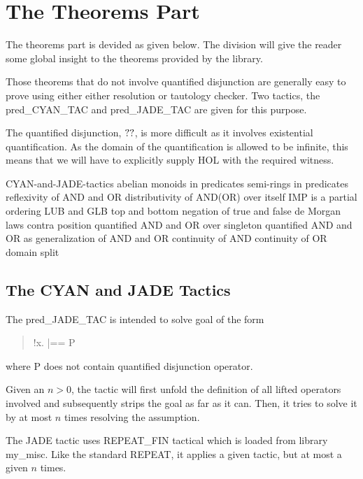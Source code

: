 \chapter{The Theorems Part}
\label{proof}

The theorems part is devided as given below. The division will give
the reader some global insight to the theorems  provided by the
library.

Those theorems that do not involve quantified disjunction are
generally easy to prove using either either resolution or tautology
checker. Two tactics, the \code{}pred_CYAN_TAC\edoc{} and \code{}pred_JADE_TAC\edoc{} are
given for this purpose.

The quantified disjunction, $\mathop{??}$, is more difficult as it involves
existential quantification. As the domain of the quantification is
allowed to be infinite, this means that we will have to explicitly
supply HOL with the required witness.

\enddocs
{}
\endmoddef
\LA{}CYAN-and-JADE-tactics\RA{}
\LA{}abelian monoids in predicates\RA{}
\LA{}semi-rings in predicates\RA{}
\LA{}reflexivity of AND and OR\RA{}
\LA{}distributivity of AND(OR) over itself\RA{}
\LA{}IMP is a partial ordering\RA{}
\LA{}LUB and GLB\RA{}
\LA{}top and bottom\RA{}
\LA{}negation of true and false\RA{}
\LA{}de Morgan laws\RA{}
\LA{}contra position\RA{}
\LA{}quantified AND and OR over singleton\RA{}
\LA{}quantified AND and OR as generalization of AND and OR\RA{}
\LA{}continuity of AND\RA{}
\LA{}continuity of OR\RA{}
\LA{}domain split\RA{}

\endcode
{}

\section{The CYAN and JADE Tactics}
\label{JADE_CYAN}

The \code{}pred_JADE_TAC\edoc{} is intended to solve goal of the form
\begin{quote} \code{}!x. |== P\edoc{} \end{quote} where \code{}P\edoc{} does not contain
quantified disjunction operator.  

Given an $n>0$, the tactic will first unfold the definition of all
lifted operators involved and subsequently strips the goal as far as
it can.  Then, it tries to solve it by at most $n$ times resolving the
assumption.

The JADE tactic uses \code{}REPEAT_FIN\edoc{} tactical which is loaded from
library \code{}my_misc\edoc{}. Like the standard \code{}REPEAT\edoc{}, it applies a given
tactic, but at most a given $n$ times.

